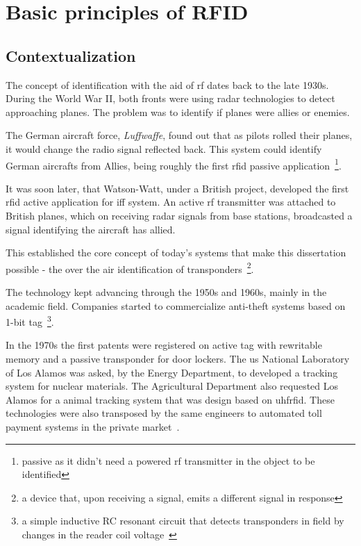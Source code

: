 \chapter{Basic principles of RFID}

\section{Contextualization}

The concept of identification with the aid of \ac{rf} dates back to the late 1930s. During the World War II, both fronts were using radar technologies to detect approaching planes. The problem was to identify if planes were allies or enemies.

The German aircraft force, \emph{Luffwaffe}, found out that as pilots rolled their planes, it would change the radio signal reflected back. This system could identify German aircrafts from Allies, being roughly the first \ac{rfid} passive application~\footnote{passive as it didn't need a powered \ac{rf} transmitter in the object to be identified}.~\cite{dobkinRFRFIDPassive2007}

It was soon later, that Watson-Watt, under a British project, developed the first \ac{rfid} active application for \ac{iff} system. An active \ac{rf} transmitter was attached to British planes, which on receiving radar signals from base stations, broadcasted a signal identifying the aircraft has allied.~\cite{HistoryRFIDTechnology}

This established the core concept of today's systems that make this dissertation possible - the over the air identification of transponders~\footnote{a device that, upon receiving a signal, emits a different signal in response}.

The technology kept advancing through the 1950s and 1960s, mainly in the academic field. Companies started to commercialize anti-theft systems based on 1-bit tag~\footnote{a simple inductive RC resonant circuit that detects transponders in field by changes in the reader coil voltage~\cite{andreventuradacruzmarnotozuqueteIdentificacaoPorRFID2018}}.

In the 1970s the first patents were registered on active tag with rewritable memory and a passive transponder for door lockers. The \ac{us} National Laboratory of Los Alamos was asked, by the Energy Department, to developed a tracking system for nuclear materials. The Agricultural Department also requested Los Alamos for a animal tracking system that was design based on \ac{uhfrfid}. These technologies were also transposed by the same engineers to automated toll payment systems in the private market~\cite{landtHistoryRFID2005, HistoryRFIDTechnology,casierAnalogCircuitDesign2011}.

